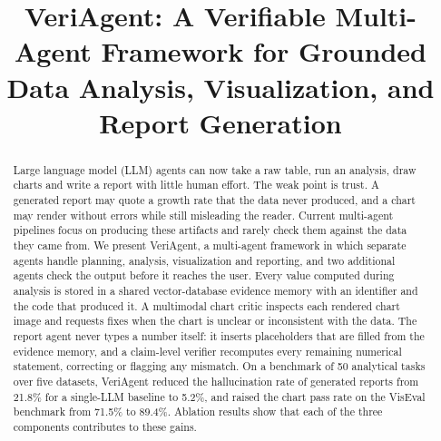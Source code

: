 \documentclass[conference]{IEEEtran}
\newcommand{\res}[1]{\textcolor{red}{#1}}
\newcommand{\HRbaseA}{\res{21.8}}    %
\newcommand{\HRfull}{\res{5.2}}      %
\newcommand{\CPRbaseA}{\res{71.5}}   %
\newcommand{\CPRfull}{\res{89.4}}    %
\renewcommand{\res}[1]{#1}   %
\begin{document}
\title{VeriAgent: A Verifiable Multi-Agent Framework for Grounded Data Analysis, Visualization, and Report Generation}

\author{
\and
{}
}

\maketitle

\begin{abstract}
Large language model (LLM) agents can now take a raw table, run an analysis, draw charts and write a report with little human effort. The weak point is trust. A generated report may quote a growth rate that the data never produced, and a chart may render without errors while still misleading the reader. Current multi-agent pipelines focus on producing these artifacts and rarely check them against the data they came from. We present VeriAgent, a multi-agent framework in which separate agents handle planning, analysis, visualization and reporting, and two additional agents check the output before it reaches the user. Every value computed during analysis is stored in a shared vector-database evidence memory with an identifier and the code that produced it. A multimodal chart critic inspects each rendered chart image and requests fixes when the chart is unclear or inconsistent with the data. The report agent never types a number itself: it inserts placeholders that are filled from the evidence memory, and a claim-level verifier recomputes every remaining numerical statement, correcting or flagging any mismatch. On a benchmark of 50 analytical tasks over five datasets, VeriAgent reduced the hallucination rate of generated reports from \HRbaseA{}\% for a single-LLM baseline to \HRfull{}\%, and raised the chart pass rate on the VisEval benchmark from \CPRbaseA{}\% to \CPRfull{}\%. Ablation results show that each of the three components contributes to these gains.
\end{abstract}
\end{document}

